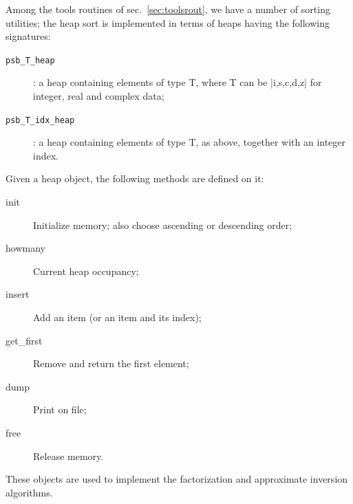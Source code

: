 Among the tools routines of sec.~\ref{sec:toolsrout}, we have a number
of sorting utilities; the heap sort is implemented in terms of heaps
having the following signatures:
\begin{description}
\item[\tt psb\_T\_heap]: a heap containing elements of type T, where T
  can be \fortinline|i,s,c,d,z| for integer, real and complex data;
\item[\tt psb\_T\_idx\_heap]: a heap containing elements of type T, as
  above, together with an integer index.
\end{description}
Given a heap object, the following methods are defined on it:
\begin{description}
\item[init] Initialize memory; also choose ascending or descending
  order;
\item[howmany] Current heap occupancy;
\item[insert] Add an item (or an item and its index);
\item[get\_first] Remove and return the first element;
\item[dump] Print on file;
\item[free] Release memory.
\end{description}
These objects are used to implement the factorization
and approximate inversion algorithms. 

